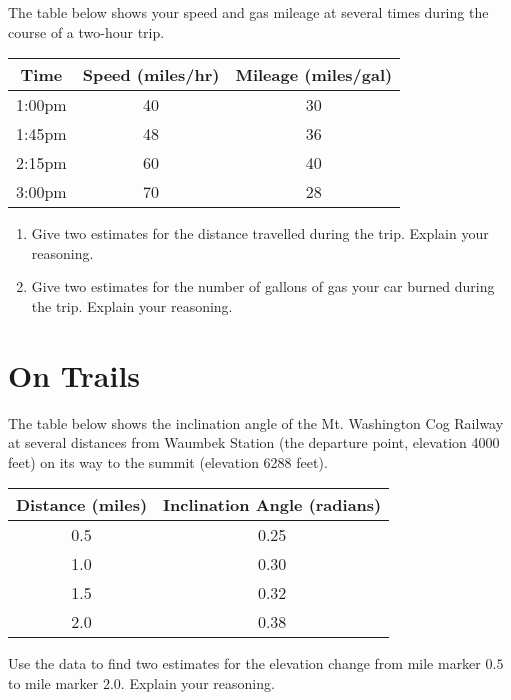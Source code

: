 \documentclass{ximera}
\begin{document}
\begin{exercise}  \label{EX:JJndre344adf}
The table below shows your speed and gas mileage at several times during the course of a two-hour trip.

\begin{tabular}{|c|c|c|}
\hline
Time & Speed (miles/hr) & Mileage (miles/gal) \\
\hline
1:00pm & 40 & 30 \\  \hline
1:45pm & 48 & 36 \\  \hline
2:15pm & 60 & 40 \\ \hline
3:00pm & 70 & 28 \\
\hline
\end{tabular}

\begin{enumerate}

\item Give two estimates for the distance travelled during the trip. Explain your reasoning.

\item Give two estimates for the number of gallons of gas your car burned during the trip. Explain your reasoning.

\end{enumerate}
\end{exercise}


\section{On Trails}

\begin{exercise}  \label{EX:MnVWeDF3x}
The table below shows the inclination angle of the Mt. Washington Cog Railway at several distances from Waumbek Station (the departure point, elevation 4000 feet) on its way to the summit (elevation 6288 feet).

\begin{tabular}{|c|c|}
\hline
Distance (miles) & Inclination Angle (radians) \\
\hline
0.5 & 0.25 \\  \hline
1.0 & 0.30 \\ \hline
1.5 & 0.32 \\ \hline
2.0 & 0.38  \\ \hline
\hline
\end{tabular}

Use the data to find two estimates for the elevation change from mile marker $0.5$ to mile marker $2.0$. Explain your reasoning.
\end{exercise}
\end{document}
